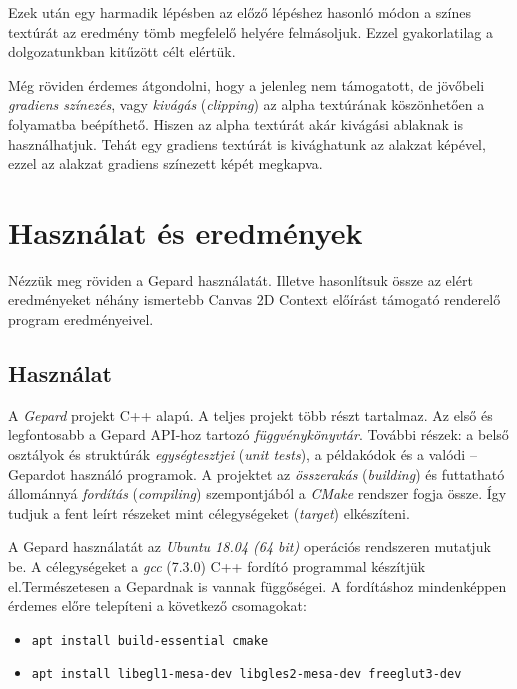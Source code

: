 \documentclass[12pt]{report}
\theoremstyle{definition}
\newcommand{\inenglish}[1]{\textsl{#1}}
\newcommand{\func}[1]{{\textsl{#1}}}
\begin{document}
Ezek után egy harmadik lépésben az előző lépéshez hasonló módon a színes
textúrát az eredmény tömb megfelelő helyére felmásoljuk. Ezzel gyakorlatilag a
dolgozatunkban kitűzött célt elértük.

Még röviden érdemes átgondolni, hogy a jelenleg nem támogatott, de jövőbeli
\emph{gradiens színezés}, vagy \emph{kivágás} (\inenglish{clipping}) az alpha
textúrának köszönhetően a folyamatba beépíthető. Hiszen az alpha textúrát akár
kivágási ablaknak is használhatjuk. Tehát egy gradiens textúrát is kivághatunk
az alakzat képével, ezzel az alakzat gradiens színezett képét megkapva.



    \chapter{Használat és eredmények}

Nézzük meg röviden a Gepard használatát. Illetve hasonlítsuk össze az elért
eredményeket néhány ismertebb Canvas 2D Context előírást támogató renderelő
program eredményeivel.

    \section{Használat}

A \emph{Gepard} projekt C++ alapú. A teljes projekt több részt tartalmaz. Az
első és legfontosabb a Gepard API-hoz tartozó \emph{függvénykönyvtár}. További
részek: a belső osztályok és struktúrák \emph{egységtesztjei} (\inenglish{unit
tests}), a példakódok és a valódi -- Gepardot használó programok. A projektet
az \emph{összerakás} (\inenglish{building}) és futtatható állománnyá
\emph{fordítás} (\inenglish{compiling}) szempontjából a \func{CMake} rendszer
fogja össze. Így tudjuk a fent leírt részeket mint célegységeket
(\inenglish{target}) elkészíteni.

A Gepard használatát az \emph{Ubuntu 18.04 (64 bit)} operációs rendszeren
mutatjuk be. A célegységeket a \emph{gcc} (7.3.0) C++ fordító programmal
készítjük el.Természetesen a Gepardnak is vannak függőségei. A fordításhoz
mindenképpen érdemes előre telepíteni a következő csomagokat:
  {\small
    \begin{itemize} \renewcommand\labelitemi{\texttt{\$}}
      \item \texttt{apt install build-essential cmake}
      \item\texttt{apt install libegl1-mesa-dev libgles2-mesa-dev freeglut3-dev}
    \end{itemize}
  }
\end{document}
